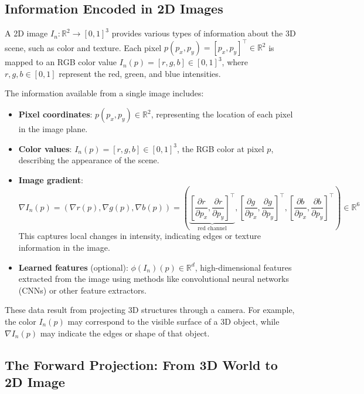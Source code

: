 \documentclass{article}
\begin{document}
\subsection{Information Encoded in 2D Images}

A 2D image \( I_n: \mathbb{R}^2 \to [0,1]^3 \) provides various types of information about the 3D scene, such as color and texture. Each pixel \( p(p_x, p_y) = [p_x, p_y]^\top \in \mathbb{R}^2 \) is mapped to an RGB color value \( I_n(p) = [r, g, b] \in [0,1]^3 \), where \( r, g, b \in [0,1] \) represent the red, green, and blue intensities.

The information available from a single image includes:
\begin{itemize}
    \item \textbf{Pixel coordinates}: \( p(p_x, p_y) \in \mathbb{R}^2 \), representing the location of each pixel in the image plane.
    \item \textbf{Color values}: \( I_n(p) = [r, g, b] \in [0,1]^3 \), the RGB color at pixel \( p \), describing the appearance of the scene.
    \item \textbf{Image gradient}:
    \[
    \nabla I_n(p) = \left( \nabla r(p), \nabla g(p), \nabla b(p) \right) = \left( \underbrace{\left[ \frac{\partial r}{\partial p_x}, \frac{\partial r}{\partial p_y} \right]^\top}_{\text{red channel}}, \left[ \frac{\partial g}{\partial p_x}, \frac{\partial g}{\partial p_y} \right]^\top, \left[ \frac{\partial b}{\partial p_x}, \frac{\partial b}{\partial p_y} \right]^\top \right) \in \mathbb{R}^6
    \]
    This captures local changes in intensity, indicating edges or texture information in the image.
    \item \textbf{Learned features} (optional): \( \phi(I_n)(p) \in \mathbb{R}^d \), high-dimensional features extracted from the image using methods like convolutional neural networks (CNNs) or other feature extractors.
\end{itemize}

These data result from projecting 3D structures through a camera. For example, the color \( I_n(p) \) may correspond to the visible surface of a 3D object, while \( \nabla I_n(p) \) may indicate the edges or shape of that object.

\subsection{The Forward Projection: From 3D World to 2D Image}
\end{document}
